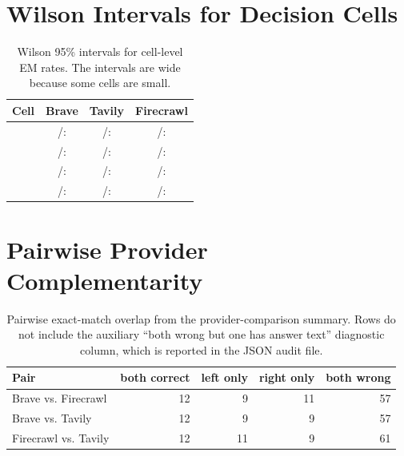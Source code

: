 \section{Wilson Intervals for Decision Cells}
\label{app:wilson}
\begin{table}[h]
\centering
\small
\begin{tabular}{lccc}
\toprule
\textbf{Cell} & \textbf{Brave} & \textbf{Tavily} & \textbf{Firecrawl} \\
\midrule
\smart{} & \BraveSmartEM{}/\BraveSmartN{}: \BraveSmartRate{} \BraveSmartCI{} & \TavilySmartEM{}/\TavilySmartN{}: \TavilySmartRate{} \TavilySmartCI{} & \FirecrawlSmartEM{}/\FirecrawlSmartN{}: \FirecrawlSmartRate{} \FirecrawlSmartCI{} \\
\missed{} & \BraveMissedEM{}/\BraveMissedN{}: \BraveMissedRate{} \BraveMissedCI{} & \TavilyMissedEM{}/\TavilyMissedN{}: \TavilyMissedRate{} \TavilyMissedCI{} & \FirecrawlMissedEM{}/\FirecrawlMissedN{}: \FirecrawlMissedRate{} \FirecrawlMissedCI{} \\
\blind{} & \BraveBlindEM{}/\BraveBlindN{}: \BraveBlindRate{} \BraveBlindCI{} & \TavilyBlindEM{}/\TavilyBlindN{}: \TavilyBlindRate{} \TavilyBlindCI{} & \FirecrawlBlindEM{}/\FirecrawlBlindN{}: \FirecrawlBlindRate{} \FirecrawlBlindCI{} \\
\noop{} & \BraveNoopEM{}/\BraveNoopN{}: \BraveNoopRate{} \BraveNoopCI{} & \TavilyNoopEM{}/\TavilyNoopN{}: \TavilyNoopRate{} \TavilyNoopCI{} & \FirecrawlNoopEM{}/\FirecrawlNoopN{}: \FirecrawlNoopRate{} \FirecrawlNoopCI{} \\
\bottomrule
\end{tabular}
\caption{Wilson 95\% intervals for cell-level EM rates. The intervals are wide because some cells are small.}
\end{table}

\section{Pairwise Provider Complementarity}
\label{app:pairwise}
\begin{table}[h]
\centering
\small
\begin{tabular}{lrrrr}
\toprule
\textbf{Pair} & \textbf{both correct} & \textbf{left only} & \textbf{right only} & \textbf{both wrong} \\
\midrule
Brave vs. Firecrawl & 12 & 9 & 11 & 57 \\
Brave vs. Tavily & 12 & 9 & 9 & 57 \\
Firecrawl vs. Tavily & 12 & 11 & 9 & 61 \\
\bottomrule
\end{tabular}
\caption{Pairwise exact-match overlap from the provider-comparison summary. Rows do not include the auxiliary ``both wrong but one has answer text'' diagnostic column, which is reported in the JSON audit file.}
\end{table}

